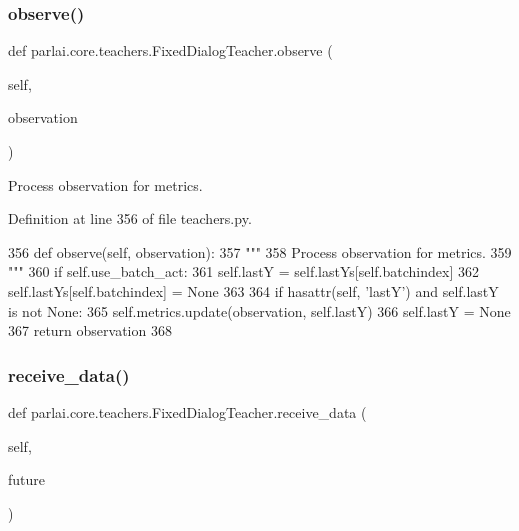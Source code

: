 \subsubsection{\texorpdfstring{observe()}{observe()}}
{\footnotesize\ttfamily def parlai.\+core.\+teachers.\+Fixed\+Dialog\+Teacher.\+observe (\begin{DoxyParamCaption}\item[{}]{self,  }\item[{}]{observation }\end{DoxyParamCaption})}

\begin{DoxyVerb}Process observation for metrics.
\end{DoxyVerb}
 

Definition at line 356 of file teachers.\+py.


\begin{DoxyCode}
356     \textcolor{keyword}{def }observe(self, observation):
357         \textcolor{stringliteral}{"""}
358 \textcolor{stringliteral}{        Process observation for metrics.}
359 \textcolor{stringliteral}{        """}
360         \textcolor{keywordflow}{if} self.use\_batch\_act:
361             self.lastY = self.lastYs[self.batchindex]
362             self.lastYs[self.batchindex] = \textcolor{keywordtype}{None}
363 
364         \textcolor{keywordflow}{if} hasattr(self, \textcolor{stringliteral}{'lastY'}) \textcolor{keywordflow}{and} self.lastY \textcolor{keywordflow}{is} \textcolor{keywordflow}{not} \textcolor{keywordtype}{None}:
365             self.metrics.update(observation, self.lastY)
366             self.lastY = \textcolor{keywordtype}{None}
367         \textcolor{keywordflow}{return} observation
368 
\end{DoxyCode}
\mbox{\label{classparlai_1_1core_1_1teachers_1_1FixedDialogTeacher_a001ed7924490d0e291588c54d383384a}} 
\subsubsection{\texorpdfstring{receive\+\_\+data()}{receive\_data()}}
{\footnotesize\ttfamily def parlai.\+core.\+teachers.\+Fixed\+Dialog\+Teacher.\+receive\+\_\+data (\begin{DoxyParamCaption}\item[{}]{self,  }\item[{}]{future }\end{DoxyParamCaption})}

